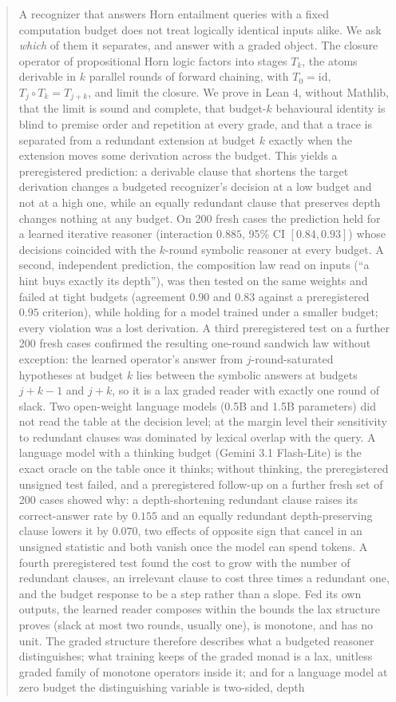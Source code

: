 \begin{abstract}
A recognizer that answers Horn entailment queries with a fixed computation budget does not treat logically identical inputs alike. We ask \emph{which} of them it separates, and answer with a graded object. The closure operator of propositional Horn logic factors into stages \(T_k\), the atoms derivable in \(k\) parallel rounds of forward chaining, with \(T_0=\mathrm{id}\), \(T_j\circ T_k=T_{j+k}\), and limit the closure. We prove in Lean 4, without Mathlib, that the limit is sound and complete, that budget-\(k\) behavioural identity is blind to premise order and repetition at every grade, and that a trace is separated from a redundant extension at budget \(k\) exactly when the extension moves some derivation across the budget. This yields a preregistered prediction: a derivable clause that shortens the target derivation changes a budgeted recognizer's decision at a low budget and not at a high one, while an equally redundant clause that preserves depth changes nothing at any budget. On 200 fresh cases the prediction held for a learned iterative reasoner (interaction \(0.885\), 95\% CI \([0.84,0.93]\)) whose decisions coincided with the \(k\)-round symbolic reasoner at every budget. A second, independent prediction, the composition law read on inputs (``a hint buys exactly its depth''), was then tested on the same weights and failed at tight budgets (agreement \(0.90\) and \(0.83\) against a preregistered \(0.95\) criterion), while holding for a model trained under a smaller budget; every violation was a lost derivation. A third preregistered test on a further 200 fresh cases confirmed the resulting one-round sandwich law without exception: the learned operator's answer from \(j\)-round-saturated hypotheses at budget \(k\) lies between the symbolic answers at budgets \(j+k-1\) and \(j+k\), so it is a lax graded reader with exactly one round of slack. Two open-weight language models (0.5B and 1.5B parameters) did not read the table at the decision level; at the margin level their sensitivity to redundant clauses was dominated by lexical overlap with the query. A language model with a thinking budget (Gemini 3.1 Flash-Lite) is the exact oracle on the table once it thinks; without thinking, the preregistered unsigned test failed, and a preregistered follow-up on a further fresh set of 200 cases showed why: a depth-shortening redundant clause raises its correct-answer rate by \(0.155\) and an equally redundant depth-preserving clause lowers it by \(0.070\), two effects of opposite sign that cancel in an unsigned statistic and both vanish once the model can spend tokens. A fourth preregistered test found the cost to grow with the number of redundant clauses, an irrelevant clause to cost three times a redundant one, and the budget response to be a step rather than a slope. Fed its own outputs, the learned reader composes within the bounds the lax structure proves (slack at most two rounds, usually one), is monotone, and has no unit. The graded structure therefore describes what a budgeted reasoner distinguishes; what training keeps of the graded monad is a lax, unitless graded family of monotone operators inside it; and for a language model at zero budget the distinguishing variable is two-sided, depth 
\end{abstract}
